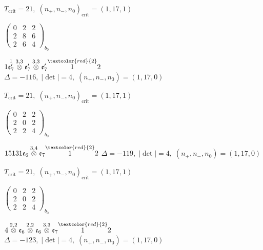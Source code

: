 \documentclass[10pt]{article}
\begin{document}
\hspace{1em}$T_{\text{crit}}=21,\; (n_+,n_-,n_0)_{\text{crit}}=(1,17,1)$

\hspace{2em}$\left(\begin{smallmatrix}0 & 2 & 2 \\ 2 & 8 & 6 \\ 2 & 6 & 4\end{smallmatrix}\right)_{\!b_0}$

\smallskip

$1\overset{1}{\mathfrak{e}_7'}\overset{3,3}{\otimes}\mathfrak{e}_7'\overset{3,3}{\otimes}\mathfrak{e}_7'\overset{\textcolor{red}{2}}{1}2$ \quad $\Delta=-116,\; |\det|=4,\; (n_+,n_-,n_0)=(1,17,0)$

\hspace{1em}$T_{\text{crit}}=21,\; (n_+,n_-,n_0)_{\text{crit}}=(1,17,1)$

\hspace{2em}$\left(\begin{smallmatrix}0 & 2 & 2 \\ 2 & 0 & 2 \\ 2 & 2 & 4\end{smallmatrix}\right)_{\!b_0}$

\smallskip

$15131\mathfrak{e}_6\overset{3,4}{\otimes}\mathfrak{e}_7\overset{\textcolor{red}{2}}{1}2$ \quad $\Delta=-119,\; |\det|=4,\; (n_+,n_-,n_0)=(1,17,0)$

\hspace{1em}$T_{\text{crit}}=21,\; (n_+,n_-,n_0)_{\text{crit}}=(1,17,1)$

\hspace{2em}$\left(\begin{smallmatrix}0 & 2 & 2 \\ 2 & 0 & 2 \\ 2 & 2 & 4\end{smallmatrix}\right)_{\!b_0}$

\smallskip

$4\overset{2,2}{\otimes}\mathfrak{e}_6\overset{2,2}{\otimes}\mathfrak{e}_6\overset{3,3}{\otimes}\mathfrak{e}_7\overset{\textcolor{red}{2}}{1}2$ \quad $\Delta=-123,\; |\det|=4,\; (n_+,n_-,n_0)=(1,17,0)$
\end{document}
